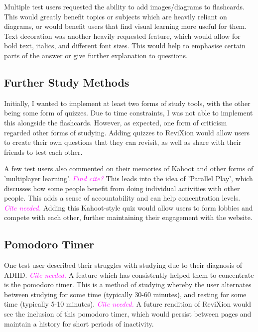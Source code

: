 \documentclass{report}
\begin{document}
Multiple test users requested the ability to add images/diagrams to flashcards.
This would greatly benefit topics or subjects which are heavily reliant on diagrams, or would benefit users that find visual learning more useful for them.
Text decoration was another heavily requested feature, which would allow for bold text, italics, and different font sizes.
This would help to emphasise certain parts of the answer or give further explanation to questions.

\subsection{Further Study Methods}

Initially, I wanted to implement at least two forms of study tools, with the other being some form of quizzes.
Due to time constraints, I was not able to implement this alongside the flashcards.
However, as expected, one form of criticism regarded other forms of studying.
Adding quizzes to ReviXion would allow users to create their own questions that they can revisit,
as well as share with their friends to test each other.

A few test users also commented on their memories of Kahoot
and other forms of 'multiplayer learning'. \textcolor{magenta}{\textit{Find cite?}}
This leads into the idea of 'Parallel Play', which discusses how some people benefit from doing individual activities with other people.
This adds a sense of accountability and can help concentration levels. \textcolor{magenta}{\textit{Cite needed.}}
Adding this Kahoot-style quiz would allow users to form lobbies and compete with each other,
further maintaining their engagement with the website.

\subsection{Pomodoro Timer}

One test user described their struggles with studying due to their diagnosis of ADHD. \textcolor{magenta}{\textit{Cite needed.}}
A feature which has consistently helped them to concentrate is the pomodoro timer.
This is a method of studying whereby the user alternates between studying for some time (typically 30-60 minutes), and resting for some time (typically 5-10 minutes).
\textcolor{magenta}{\textit{Cite needed.}}
A future rendition of ReviXion would see the inclusion of this pomodoro timer,
which would persist between pages and maintain a history for short periods of inactivity.
\end{document}
